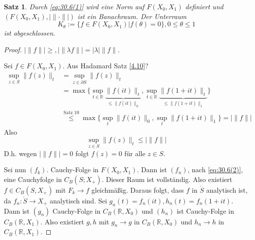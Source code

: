 \documentclass[
paper=a4,
bibtotocnumbered,
liststotocnumbered,
tablecaptionabove,
pointlessnumbers,
twoside,
openright,
10pt
]
{report}
\newtheorem{satz}[thm]{Satz}
\theoremstyle{definition}
\numberwithin{equation}{chapter}
\begin{document}
\begin{satz}\label{4.11}
Durch \eqref{eq:30.6(1)} wird eine Norm auf $F(X_0, X_1)$ definiert und $(F(X_0, X_1), |\| \cdot \| |)$ ist ein Banachraum. Der Unterraum
\begin{equation}
K_{\theta} := \{ f\in F(X_0, X_1) | f(\theta)=0\}, 0 \le \theta \le 1
\end{equation}
ist abgeschlossen.
\end{satz}
\begin{proof}
$|\| f\| | \ge, | \| \lambda f \| | = | \lambda | \| f\|.$

Sei $f\in F(X_0, X_1)$. Aus Hadamard Satz \ref{4.10}?
\begin{align*}
\sup_{z\in S} \| f(z)\|_t &= \sup_{z\in \partial S} \| f(z)\|_t\\
&= \max \{ \sup_{t\in \mathbb R} \underbrace{\| f(it)\|_t}_{\le \| f(it)\|_0}, \sup_{t\in \mathbb R} \underbrace{\| f(1+it)\|_t}_{\le \| f(1+it)\|_1}\}\\
&\stackrel{\text{Satz 10}}\le \max\{\sup_t \| f(it)\|_0, \sup_t \| f(1+it)\|_1\} = | \| f\| |
\end{align*} 
Also 
\begin{equation}\label{eq:30.6(2)}
\sup_{z\in S} \| f(z)\|_t\le |\| f\| |
\end{equation}
D.h. wegen $|\| f\| | =0$  folgt $f(z)=0$ für alle $z\in S$.

Sei nun $(f_k)$. Cauchy-Folge in $F(X_0, X_1)$. Dann ist $(f_n)$, nach \eqref{eq:30.6(2)}, eine Cauchyfolge in $C_B(S; X_+)$. Dieser Raum ist vollständig. Also existiert $f\in C_B(S, X_+)$ mit $F_k \to f$ gleichmäßig. Daraus folgt, dass $f$ in $\mathring S$ analytisch ist, da $f_n: \mathring S \to X_+$ analytisch sind. Sei $g_n(t) = f_n(it), h_n(t) = f_n(1+it)$. Dann ist $(g_n)$ Cauchy-Folge in $C_B(\mathbb R, X_0)$ und $(h_n)$ ist Cauchy-Folge in $C_B(\mathbb R, X_1)$. Also existiert  $g,h$ mit $g_n \to g$ in $C_B(\mathbb R, X_0)$ und $h_n \to h$ in $C_B(\mathbb R, X_1)$.


\end{proof}
\end{document}
